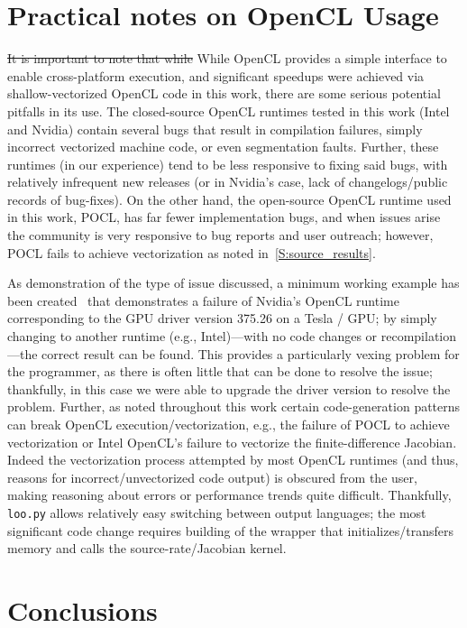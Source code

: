 \documentclass[12pt,number,sort&compress,preprint]{elsarticle}
\newcommand{\revisedelete}[1]{\sloppy\textcolor{RoyalPurple}{\sout{#1}}} %
\begin{document}
\section{Practical notes on OpenCL Usage}
\label{S:opencl}
\revisedelete{It is important to note that while }While OpenCL provides a simple interface to enable cross-platform execution, and significant speedups were achieved via shallow-vectorized OpenCL code in this work, there are some serious potential pitfalls in its use.
The closed-source OpenCL runtimes tested in this work (Intel and Nvidia) contain several bugs that result in compilation failures, simply incorrect vectorized machine code, or even segmentation faults.
Further, these runtimes (in our experience) tend to be less responsive to fixing said bugs, with relatively infrequent new releases (or in Nvidia's case, lack of changelogs\slash public records of bug-fixes).
On the other hand, the open-source OpenCL runtime used in this work, POCL, has far fewer implementation bugs, and when issues arise the community is very responsive to bug reports and user outreach; however, POCL fails to achieve vectorization as noted in~\cref{S:source_results}.

As demonstration of the type of issue discussed, a minimum working example has been created~\cite{Nvidia_mwe} that demonstrates a failure of Nvidia's OpenCL runtime corresponding to the GPU driver version \num{375.26} on a Tesla \gpunew/ GPU; by simply changing to another runtime (e.g., Intel)---with no code changes or recompilation---the correct result can be found.
This provides a particularly vexing problem for the programmer, as there is often little that can be done to resolve the issue; thankfully, in this case we were able to upgrade the driver version to resolve the problem.
Further, as noted throughout this work certain code-generation patterns can break OpenCL execution\slash vectorization, e.g., the failure of POCL to achieve vectorization or Intel OpenCL's failure to vectorize the finite-difference Jacobian.
Indeed the vectorization process attempted by most OpenCL runtimes (and thus, reasons for incorrect\slash unvectorized code output) is obscured from the user, making reasoning about errors or performance trends quite difficult.
Thankfully, \texttt{loo.py} allows relatively easy switching between output languages; the most significant code change requires building of the wrapper that initializes\slash transfers memory and calls the source-rate\slash Jacobian kernel.


\section{Conclusions}
\label{S:future}
\end{document}
